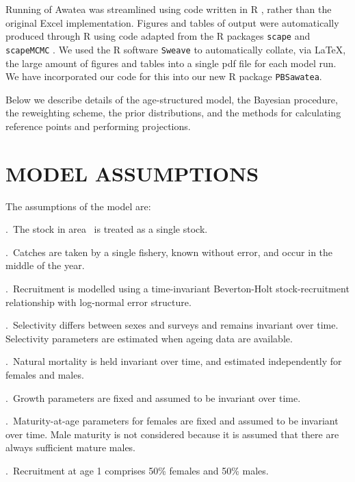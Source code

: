 
Running of Awatea was streamlined using code written in R \citep{R12}, rather than the original Excel implementation. Figures and tables of output were automatically produced through R using code adapted from the R packages {\tt scape} \citep{magn09} and {\tt scapeMCMC} \citep{ms07}. We used the R software {\tt Sweave} \citep{leis02} to automatically collate, via LaTeX, the large amount of figures and tables into a single pdf file for each model run. We have incorporated our code for this into our new R package {\tt PBSawatea}.

Below we describe details of the age-structured model, the Bayesian procedure, the reweighting scheme, the prior distributions, and the methods for calculating reference points and performing projections.



\section{MODEL ASSUMPTIONS}

The assumptions of the model are:

.~The stock in area \area~is treated as a single stock.

.~Catches are taken by a single fishery, known without error, and occur in the middle of the year.

.~Recruitment is modelled using a time-invariant Beverton-Holt stock-recruitment relationship with log-normal error structure.

.~Selectivity differs between sexes and surveys and remains invariant over time. Selectivity parameters are estimated when ageing data are available.

.~Natural mortality is held invariant over time, and estimated independently for females and males.

.~Growth parameters are fixed and assumed to be invariant over time.

.~Maturity-at-age parameters for females are fixed and assumed to be invariant over time. Male maturity is not considered because it is assumed that there are always sufficient mature males.

.~Recruitment at age 1 comprises 50\% females and 50\% males.

